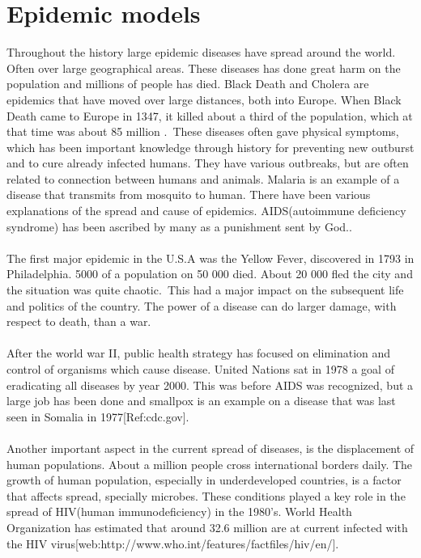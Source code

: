\documentclass[%
twoside,                 %
final,                   %
10pt]{article}
\begin{document}
\section{Epidemic models}
Throughout the history large epidemic diseases have spread around the world. Often over large geographical areas. These diseases has done great harm on the population and millions of people has died. Black Death and Cholera are epidemics that have moved over large distances, both into Europe. When Black Death came to Europe in 1347, it killed about a third of the population, which at that time was about 85 million \cite[p.~315]{murray2002mathematical}.~These diseases often gave physical symptoms, which has been important knowledge through history for preventing new outburst and to cure already infected humans. They have various outbreaks, but are often related to connection between humans and animals. Malaria is an example of a disease that transmits from mosquito to human. There have been various explanations of the spread and cause of epidemics. AIDS(autoimmune deficiency syndrome) has been ascribed by many as a punishment sent by God.\cite[p.~316]{murray2002mathematical}.~
\\
\\
The first major epidemic in the U.S.A was the Yellow Fever, discovered in 1793 in Philadelphia. 5000 of a population on 50 000 died. About 20 000 fled the city and the situation was quite chaotic\cite[p.~316]{murray2002mathematical}.~This had a major impact on the subsequent life and politics of the country. The power of a disease can do larger damage, with respect to death, than a war.
\\
\\
After the world war II, public health strategy has focused on elimination and control of organisms which cause disease. United Nations sat in 1978 a goal of eradicating all diseases by year 2000. This was before AIDS was recognized, but a large job has been done and smallpox is an example on a disease that was last seen in Somalia in 1977[Ref:cdc.gov].
\\
\\
Another important aspect in the current spread of diseases, is the displacement of human populations. About a million people cross international borders daily. The growth of human population, especially in underdeveloped countries, is a factor that affects spread, specially microbes. These conditions played a key role in the spread of HIV(human immunodeficiency) in the 1980's. World Health Organization has estimated that around 32.6 million are at current infected with the HIV virus[web:http://www.who.int/features/factfiles/hiv/en/].
\end{document}
